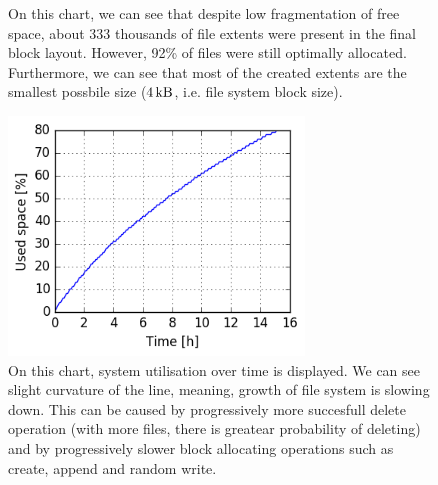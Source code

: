 \documentclass[
  color, %
  table, %
  lof,   %
  lot,   %
]{fithesis3}
\begin{document}
\begin{figure}[!htb]
    \centering
    \caption[Size distribution of file extents of XFS during testing of medium utilisation of HDD]{On this chart, we can see that despite low fragmentation of free space, about 333 thousands of file extents were present in the final block layout. However, 92\% of files were still optimally allocated. Furthermore, we can see that most of the created extents are the smallest possbile size ($\SI{4}{\kilo\byte}$, i.e. file system block size).}
    \label{fig:used80_xfs}
\end{figure}

\begin{figure}[!htb]
    \begin{minipage}{\textwidth}
        \centering
        \includegraphics[width=0.7\textwidth]{../charts/HDD_xfs/600.png}
        \caption[Usage of available space of XFS during testing of medium utilisation of HDD]{On this chart, system utilisation over time is displayed. We can see slight curvature of the line, meaning, growth of file system is slowing down. This can be caused by progressively more succesfull delete operation (with more files, there is greatear probability of deleting) and by progressively slower block allocating operations such as create, append and random write.}
\label{fig:usage80_xfs}
    \end{minipage}
\end{figure}
\end{document}
